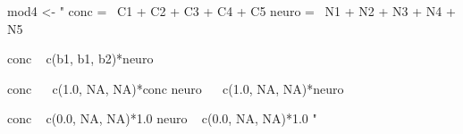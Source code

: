 \begin{Schunk}
\begin{Sinput}
 mod4 <- "
 conc =~ C1 + C2 + C3 + C4 + C5
 neuro =~ N1 + N2 + N3 + N4 + N5
 
 conc ~ c(b1, b1, b2)*neuro
 
 conc ~~ c(1.0, NA, NA)*conc
 neuro ~~ c(1.0, NA, NA)*neuro
 
 conc ~ c(0.0, NA, NA)*1.0
 neuro ~ c(0.0, NA, NA)*1.0
 "
\end{Sinput}
\end{Schunk}
